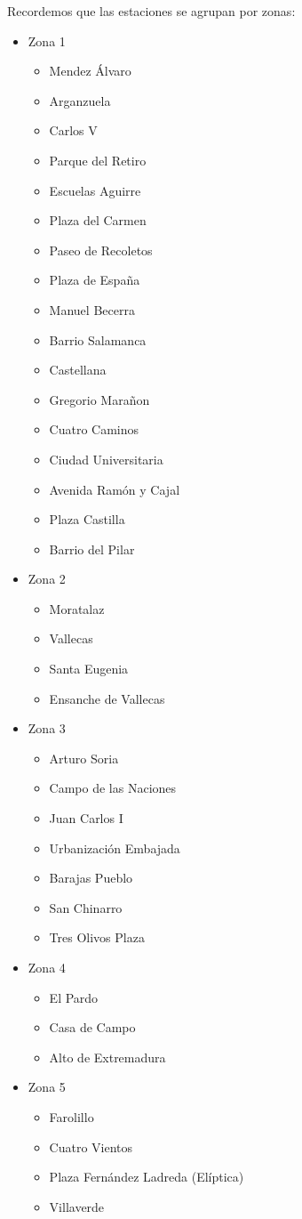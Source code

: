 Recordemos que las estaciones se agrupan por zonas:

\begin{itemize}
	\item Zona 1
	\begin{itemize}
		\item Mendez Álvaro
		\item Arganzuela
		\item Carlos V
		\item Parque del Retiro
		\item Escuelas Aguirre
		\item Plaza del Carmen
		\item Paseo de Recoletos
		\item Plaza de España
		\item Manuel Becerra
		\item Barrio Salamanca
		\item Castellana
		\item Gregorio Marañon
		\item Cuatro Caminos
		\item Ciudad Universitaria
		\item Avenida Ramón y Cajal
		\item Plaza Castilla
		\item Barrio del Pilar
	\end{itemize}
	\item Zona 2
	\begin{itemize}
		\item Moratalaz
		\item Vallecas
		\item Santa Eugenia
		\item Ensanche de Vallecas
	\end{itemize}
	\item Zona 3
	\begin{itemize}
		\item Arturo Soria
		\item Campo de las Naciones
		\item Juan Carlos I
		\item Urbanización Embajada
		\item Barajas Pueblo
		\item San Chinarro
		\item Tres Olivos Plaza
	\end{itemize}
	\item Zona 4
	\begin{itemize}
		\item El Pardo
		\item Casa de Campo
		\item Alto de Extremadura
	\end{itemize}
	\item Zona 5
	\begin{itemize}
		\item Farolillo
		\item Cuatro Vientos
		\item Plaza Fernández Ladreda (Elíptica)
		\item Villaverde
	\end{itemize}
\end{itemize}



